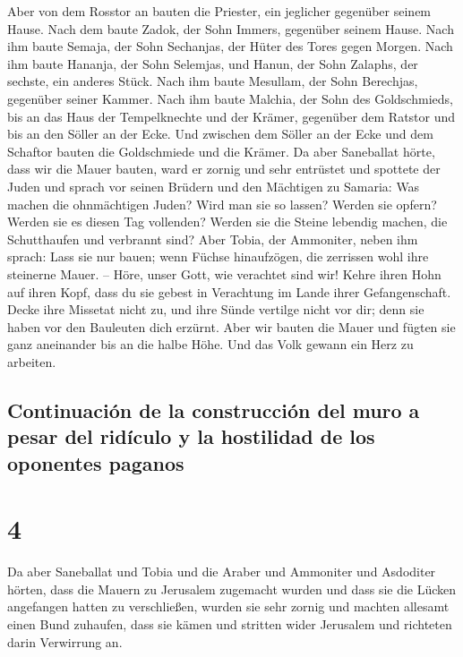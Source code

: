 Aber von dem Rosstor an bauten die Priester, ein
jeglicher gegenüber seinem Hause.  Nach dem baute Zadok,
der Sohn Immers, gegenüber seinem Hause. Nach ihm baute Semaja, der Sohn
Sechanjas, der Hüter des Tores gegen Morgen.  Nach ihm
baute Hananja, der Sohn Selemjas, und Hanun, der Sohn Zalaphs, der
sechste, ein anderes Stück. Nach ihm baute Mesullam, der Sohn Berechjas,
gegenüber seiner Kammer.  Nach ihm baute Malchia, der
Sohn des Goldschmieds, bis an das Haus der Tempelknechte und der Krämer,
gegenüber dem Ratstor und bis an den Söller an der Ecke. 
Und zwischen dem Söller an der Ecke und dem Schaftor bauten die
Goldschmiede und die Krämer.  Da aber Saneballat hörte,
dass wir die Mauer bauten, ward er zornig und sehr entrüstet und
spottete der Juden  und sprach vor seinen Brüdern und den
Mächtigen zu Samaria: Was machen die ohnmächtigen Juden? Wird man sie so
lassen? Werden sie opfern? Werden sie es diesen Tag vollenden? Werden
sie die Steine lebendig machen, die Schutthaufen und verbrannt sind?
 Aber Tobia, der Ammoniter, neben ihm sprach: Lass sie
nur bauen; wenn Füchse hinaufzögen, die zerrissen wohl ihre steinerne
Mauer. --  Höre, unser Gott, wie verachtet sind wir!
Kehre ihren Hohn auf ihren Kopf, dass du sie gebest in Verachtung im
Lande ihrer Gefangenschaft.  Decke ihre Missetat nicht
zu, und ihre Sünde vertilge nicht vor dir; denn sie haben vor den
Bauleuten dich erzürnt.  Aber wir bauten die Mauer und
fügten sie ganz aneinander bis an die halbe Höhe. Und das Volk gewann
ein Herz zu arbeiten.

\hypertarget{continuaciuxf3n-de-la-construcciuxf3n-del-muro-a-pesar-del-riduxedculo-y-la-hostilidad-de-los-oponentes-paganos}{%
\subsection{Continuación de la construcción del muro a pesar del
ridículo y la hostilidad de los oponentes
paganos}\label{continuaciuxf3n-de-la-construcciuxf3n-del-muro-a-pesar-del-riduxedculo-y-la-hostilidad-de-los-oponentes-paganos}}

\hypertarget{section-3}{%
\section{4}\label{section-3}}

 Da aber Saneballat und Tobia und die Araber und Ammoniter
und Asdoditer hörten, dass die Mauern zu Jerusalem zugemacht wurden und
dass sie die Lücken angefangen hatten zu verschließen, wurden sie sehr
zornig  und machten allesamt einen Bund zuhaufen, dass sie
kämen und stritten wider Jerusalem und richteten darin Verwirrung an.


